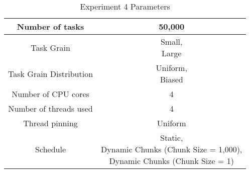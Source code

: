 \begin{table}
\centering
 \begin{tabular}{|c|c|}
  \hline
  Number of tasks & 50,000 \\
  \hline
  Task Grain & \specialcell{Small, \\ Large} \\
  \hline
  Task Grain Distribution & \specialcell{Uniform, \\ Biased} \\
  \hline
  Number of CPU cores & 4 \\
  \hline
  Number of threads used & 4 \\
  \hline
  Thread pinning & Uniform \\
  \hline
  Schedule & \specialcell{Static, \\ Dynamic Chunks (Chunk Size = 1,000), \\ Dynamic Chunks (Chunk Size = 1)} \\
  \hline
 \end{tabular}
\caption{Experiment 4 Parameters}
\iflabeld
\label{table:evaluation_ex4_parameters}
\fi
{}
\end{table}
